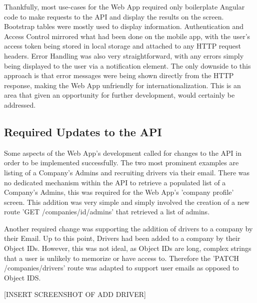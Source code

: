 Thankfully, most use-cases for the Web App required only boilerplate Angular code to make requests to the API and display the results on the screen. Bootstrap tables were mostly used to display information. Authentication and Access Control mirrored what had been done on the mobile app, with the user's access token being stored in local storage and attached to any HTTP request headers. Error Handling was also very straightforward, with any errors simply being displayed to the user via a notification element. The only downside to this approach is that error messages were being shown directly from the HTTP response, making the Web App unfriendly for internationalization. This is an area that given an opportunity for further development, would certainly be addressed.

\subsection{Required Updates to the API}
Some aspects of the Web App's development called for changes to the API in order to be implemented successfully. The two most prominent examples are listing of a Company's Admins and recruiting drivers via their email. There was no dedicated mechanism within the API to retrieve a populated list of a Company's Admins, this was required for the Web App's 'company profile' screen. This addition was very simple and simply involved the creation of a new route 'GET /companies/{id}/admins' that retrieved a list of admins.

Another required change was supporting the addition of drivers to a company by their Email. Up to this point, Drivers had been added to a company by their Object IDs. However, this was not ideal, as Object IDs are long, complex strings that a user is unlikely to memorize or have access to. Therefore the 'PATCH /companies/drivers' route was adapted to support user emails as opposed to Object IDS.

[INSERT SCREENSHOT OF ADD DRIVER]

